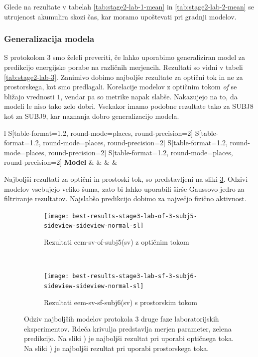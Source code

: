 Glede na rezultate v tabelah \ref{tab:stage2-lab-1-mean} in  \ref{tab:stage2-lab-2-mean} se utrujenost akumulira skozi čas, kar moramo upoštevati pri gradnji modelov.


\subsubsection{Generalizacija modela}
S protokolom 3 smo želeli preveriti, če lahko uporabimo generaliziran model za predikcijo energijske porabe na različnih merjencih. Rezultati so vidni v tabeli \ref{tab:stage2-lab-3}. Zanimivo dobimo najboljše rezultate za optični tok in ne za prostorskega, kot smo predlagali. Korelacije modelov z optičnim tokom \textit{of} se bližajo vrednosti $1$, vendar pa so metrike napak slabše. Nakazujejo na to, da modeli le niso tako zelo dobri. Vsekakor imamo podobne rezultate tako za SUBJ8 kot za SUBJ9, kar naznanja dobro generalizacijo modela.

\begin{table}[!htbp]
	\centering
	\begin{tabular}{l S[table-format=1.2, round-mode=places, round-precision=2] S[table-format=1.2, round-mode=places, round-precision=2] S[table-format=1.2, round-mode=places, round-precision=2] S[table-format=1.2, round-mode=places, round-precision=2]}
		\toprule
		\textbf{Model} &  &  &  &  \\
		\midrule
		\bottomrule
	\end{tabular}
	\caption{Validacijske metrike za protokol 3 druge faze laboratorijskih eksperimentov.}
	\label{tab:stage2-lab-3}
\end{table}

Najboljši rezultati za optični in prostoski tok, so predstavljeni na sliki \ref{fig:lab-3}. Odzivi modelov vsebujejo veliko šuma, zato bi lahko uporabili širše Gaussovo jedro za filtriranje rezultatov. Najslabšo predikcijo dobimo za največjo fizično aktivnost.

\begin{figure}[!htbp]
	\centering
	\begin{subfigure}[t]{0.45\columnwidth}
		\texttt{[image: best-results-stage3-lab-of-3-subj5-sideview-sideview-normal-sl]}
		\caption{Rezultati eem-sv-of-subj5(sv) z optičnim tokom}
		\label{fig:lab-of-3}
	\end{subfigure}
	~
	\begin{subfigure}[t]{0.45\columnwidth}
		\texttt{[image: best-results-stage3-lab-sf-3-subj6-sideview-sideview-normal-sl]}
		\caption{Rezultati eem-sv-sf-subj6(sv) s prostorskim tokom}
		\label{fig:lab-sf-3}
	\end{subfigure}
	\caption[Odziv najboljših modelov protokola 3 druge faze laboratorijskih eksperimentov]{Odziv najboljših modelov protokola 3 druge faze laboratorijskih eksperimentov. Rdeča krivulja predstavlja merjen parameter, zelena predikcijo. Na sliki ) je najboljši rezultat pri uporabi optičnega toka. Na sliki ) je najboljši rezultat pri uporabi prostorskega toka.}
	\label{fig:lab-3}
\end{figure}


